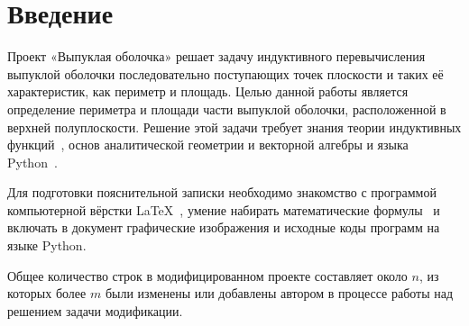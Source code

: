 \section{Введение}

Проект «Выпуклая оболочка»\cite{convex} решает задачу индуктивного 
перевычисления 
выпуклой оболочки последовательно поступающих точек плоскости и таких её
характеристик, как периметр и площадь. Целью данной работы является
определение периметра и площади части выпуклой оболочки, расположенной
в верхней полуплоскости. Решение этой задачи требует знания теории индуктивных
функций~\cite{ind-functions}, основ аналитической геометрии и векторной алгебры
и языка Python~\cite{python}.

Для подготовки пояснительной записки необходимо знакомство с программой
компьютерной вёрстки \LaTeX~\cite{rlatex}, умение набирать математические 
формулы~\cite{texbook} и включать в документ графические изображения и исходные
коды программ на языке Python.

Общее количество строк в модифицированном проекте составляет около $n$,
из которых более $m$ были изменены или добавлены автором в процессе работы
над решением задачи модификации.
